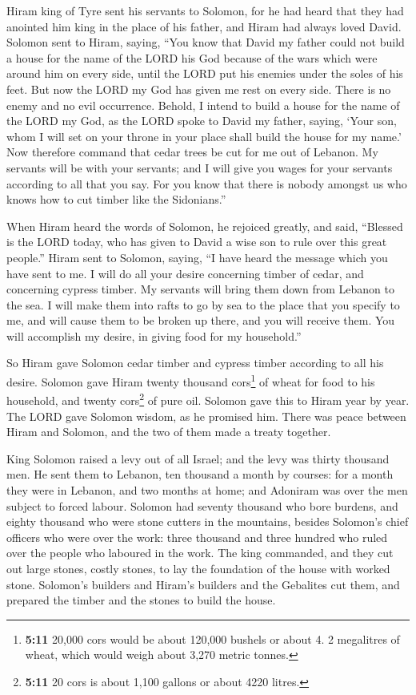  Hiram king of Tyre sent his servants to Solomon, for he
had heard that they had anointed him king in the place of his father,
and Hiram had always loved David.  Solomon sent to Hiram,
saying,  ``You know that David my father could not build a
house for the name of the LORD his God because of the wars which were
around him on every side, until the LORD put his enemies under the soles
of his feet.  But now the LORD my God has given me rest on
every side. There is no enemy and no evil occurrence. 
Behold, I intend to build a house for the name of the LORD my God, as
the LORD spoke to David my father, saying, `Your son, whom I will set on
your throne in your place shall build the house for my name.'
 Now therefore command that cedar trees be cut for me out
of Lebanon. My servants will be with your servants; and I will give you
wages for your servants according to all that you say. For you know that
there is nobody amongst us who knows how to cut timber like the
Sidonians.''

 When Hiram heard the words of Solomon, he rejoiced
greatly, and said, ``Blessed is the LORD today, who has given to David a
wise son to rule over this great people.''  Hiram sent to
Solomon, saying, ``I have heard the message which you have sent to me. I
will do all your desire concerning timber of cedar, and concerning
cypress timber.  My servants will bring them down from
Lebanon to the sea. I will make them into rafts to go by sea to the
place that you specify to me, and will cause them to be broken up there,
and you will receive them. You will accomplish my desire, in giving food
for my household.''

 So Hiram gave Solomon cedar timber and cypress timber
according to all his desire.  Solomon gave Hiram twenty
thousand cors\footnote{\textbf{5:11} 20,000 cors would be about 120,000
  bushels or about 4. 2 megalitres of wheat, which would weigh about
  3,270 metric tonnes.} of wheat for food to his household, and twenty
cors\footnote{\textbf{5:11} 20 cors is about 1,100 gallons or about 4220
  litres.} of pure oil. Solomon gave this to Hiram year by year.
 The LORD gave Solomon wisdom, as he promised him. There
was peace between Hiram and Solomon, and the two of them made a treaty
together.

 King Solomon raised a levy out of all Israel; and the
levy was thirty thousand men.  He sent them to Lebanon,
ten thousand a month by courses: for a month they were in Lebanon, and
two months at home; and Adoniram was over the men subject to forced
labour.  Solomon had seventy thousand who bore burdens,
and eighty thousand who were stone cutters in the mountains,
 besides Solomon's chief officers who were over the work:
three thousand and three hundred who ruled over the people who laboured
in the work.  The king commanded, and they cut out large
stones, costly stones, to lay the foundation of the house with worked
stone.  Solomon's builders and Hiram's builders and the
Gebalites cut them, and prepared the timber and the stones to build the
house.

